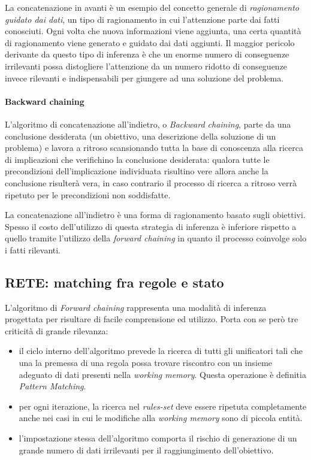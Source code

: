 La concatenazione in avanti è un esempio del concetto generale di \emph{ragionamento guidato dai dati}, un tipo di ragionamento in cui l'attenzione parte dai fatti conosciuti. Ogni volta che nuova informazioni viene aggiunta, una certa quantità di ragionamento viene generato e guidato dai dati aggiunti. Il maggior pericolo derivante da questo tipo di inferenza è che un enorme numero di conseguenze irrilevanti possa distogliere l'attenzione da un numero ridotto di conseguenze invece rilevanti e indispensabili per giungere ad una soluzione del problema. \cite{russellnorvig2009}

\paragraph{Backward chaining}
L'algoritmo di concatenazione all'indietro, o \emph{Backward chaining}, parte da una conclusione desiderata (un obiettivo, una descrizione della soluzione di un problema) e lavora a ritroso scansionando tutta la base di conoscenza alla ricerca di implicazioni che verifichino la conclusione desiderata: qualora tutte le precondizioni dell'implicazione individuata risultino vere allora anche la conclusione risulterà vera, in caso contrario il processo di ricerca a ritroso verrà ripetuto per le precondizioni non soddisfatte.

La concatenazione all'indietro è una forma di ragionamento basato sugli obiettivi. Spesso il costo dell'utilizzo di questa strategia di inferenza è inferiore rispetto a quello tramite l'utilizzo della \emph{forward chaining} in quanto il processo coinvolge solo i fatti rilevanti. \cite{russellnorvig2009}

\subsection{RETE: matching fra regole e stato}
L'algoritmo di \emph{Forward chaining} rappresenta una modalità di inferenza progettata per risultare di facile comprensione ed utilizzo. Porta con se però tre criticità di grande rilevanza: \cite{russellnorvig2009}
\begin{itemize}
	\item il ciclo interno dell'algoritmo prevede la ricerca di tutti gli unificatori tali che una la premessa di una regola possa trovare riscontro con un insieme adeguato di dati presenti nella \emph{working memory}. Questa operazione è definitia \emph{Pattern Matching}.
	\item per ogni iterazione, la ricerca nel \emph{rules-set} deve essere ripetuta completamente anche nei casi in cui le modifiche alla \emph{working memory} sono di piccola entità.
	\item l'impostazione stessa dell'algoritmo comporta il rischio di generazione di un grande numero di dati irrilevanti per il raggiungimento dell'obiettivo.
\end{itemize}

